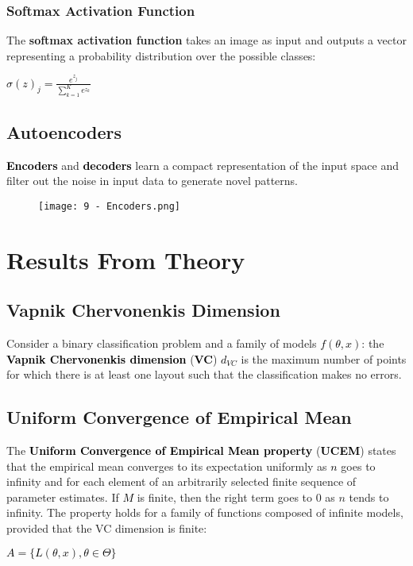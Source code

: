 \documentclass{article}
\newcommand{\bb}[1]{\textcolor{black}{\textbf{#1}}}
\newcommand{\rr}[1]{\textcolor{black}{#1}}
\newcommand{\cc}[1]{\begin{center}\textcolor{black}{#1}\end{center}}
\begin{document}
\subsubsection{Softmax Activation Function}
The \textbf{softmax activation function} takes an image as input and outputs a vector representing a probability distribution over the possible classes:
\cc{$\sigma(z)_j = \displaystyle\frac{e^{z_j}}{\displaystyle\sum^K_{k = 1}e^{z_k}}$}

\subsection{Autoencoders}
\bb{Encoders} and \bb{decoders} learn a compact representation of the input space and filter out the noise in input data to generate novel patterns. 
\begin{figure}[H]
    \centering
    \texttt{[image: 9 - Encoders.png]}
\end{figure}

\newpage

\section{Results From Theory}
\subsection{Vapnik Chervonenkis Dimension}
Consider a binary classification problem and a family of models \rr{$f(\theta, x)$}: the \bb{Vapnik Chervonenkis dimension} (\bb{VC}) \rr{$d_{VC}$} is the maximum number of points for which there is at least one layout such that the classification makes no errors.

\subsection{Uniform Convergence of Empirical Mean}
The \bb{Uniform Convergence of Empirical Mean property} (\bb{UCEM}) states that the empirical mean converges to its expectation uniformly as \rr{$n$} goes to infinity and for each element of an arbitrarily selected finite sequence of parameter estimates. If \rr{$M$} is finite, then the right term goes to $0$ as $n$ tends to infinity. The property holds for a family of functions composed of infinite models, provided that the VC dimension is finite:
\cc{$A = \{L(\theta,x), \theta \in \Theta\}$}
\end{document}
